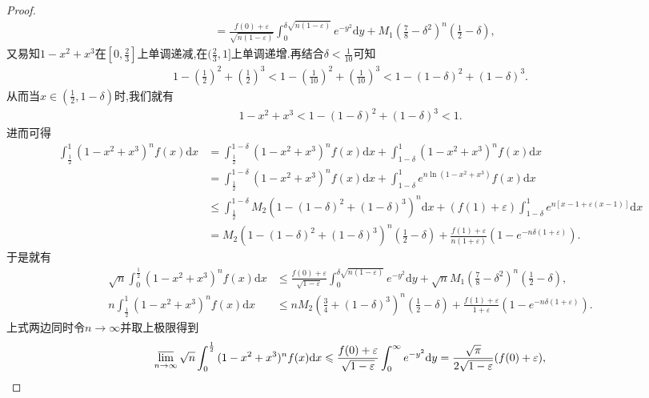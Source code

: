 \documentclass[../../main.tex]{subfiles}%
\begin{document}
\begin{proof}
\begin{align*}
&=\frac{f(0) + \varepsilon}{\sqrt{n(1 - \varepsilon)}}\int_0^{\delta\sqrt{n(1 - \varepsilon)}}{e^{-y^2}\mathrm{d}y}+M_1\left(\frac{7}{8}-\delta^2\right)^n\left(\frac{1}{2}-\delta\right),
\end{align*}
又易知$1-x^2+x^3$在$[0,\frac{2}{3}]$上单调递减,在$(\frac{2}{3},1]$上单调递增.再结合$\delta<\frac{1}{10}$可知
\begin{align*}
1-(\frac{1}{2})^2+(\frac{1}{2})^3<1-(\frac{1}{10})^2+(\frac{1}{10})^3<1-(1-\delta)^2+(1-\delta)^3.
\end{align*}
从而当$x\in (\frac{1}{2},1-\delta)$时,我们就有
\begin{align*}
1-x^2+x^3<1-(1-\delta)^2+(1-\delta)^3<1.
\end{align*}
进而可得
\begin{align*}
\int_{\frac{1}{2}}^1{(1 - x^2 + x^3)^nf(x)\mathrm{d}x}&=\int_{\frac{1}{2}}^{1 - \delta}{(1 - x^2 + x^3)^nf(x)\mathrm{d}x}+\int_{1 - \delta}^1{(1 - x^2 + x^3)^nf(x)\mathrm{d}x}\\
&=\int_{\frac{1}{2}}^{1 - \delta}{(1 - x^2 + x^3)^nf(x)\mathrm{d}x}+\int_{1 - \delta}^1{e^{n\ln(1 - x^2 + x^3)}f(x)\mathrm{d}x}\\
&\leqslant \int_{\frac{1}{2}}^{1 - \delta}{M_2\left(1-(1-\delta)^2+(1 - \delta)^3\right)^n\mathrm{d}x}+(f(1) + \varepsilon)\int_{1 - \delta}^1{e^{n[x - 1 + \varepsilon(x - 1)]}\mathrm{d}x}\\
&=M_2\left(1-(1-\delta)^2+(1 - \delta)^3\right)^n\left(\frac{1}{2}-\delta\right)+\frac{f(1) + \varepsilon}{n(1 + \varepsilon)}\left(1 - e^{-n\delta(1 + \varepsilon)}\right).
\end{align*}
于是就有
\begin{align*}
\sqrt{n}\int_0^{\frac{1}{2}}{(1 - x^2 + x^3)^nf(x)\mathrm{d}x}&\leqslant \frac{f(0) + \varepsilon}{\sqrt{1 - \varepsilon}}\int_0^{\delta\sqrt{n(1 - \varepsilon)}}{e^{-y^2}\mathrm{d}y}+\sqrt{n} M_1\left(\frac{7}{8}-\delta^2\right)^n\left(\frac{1}{2}-\delta\right),\\
n\int_{\frac{1}{2}}^1{(1 - x^2 + x^3)^nf(x)\mathrm{d}x}&\leqslant n M_2\left(\frac{3}{4}+(1 - \delta)^3\right)^n\left(\frac{1}{2}-\delta\right)+\frac{f(1) + \varepsilon}{1 + \varepsilon}\left(1 - e^{-n\delta(1 + \varepsilon)}\right).
\end{align*}
上式两边同时令\(n\rightarrow\infty\)并取上极限得到
\begin{gather*}
\varlimsup_{n\rightarrow\infty}\sqrt{n}\int_0^{\frac{1}{2}}{(1 - x^2 + x^3)^nf(x)\mathrm{d}x}\leqslant \frac{f(0) + \varepsilon}{\sqrt{1 - \varepsilon}}\int_0^{\infty}{e^{-y^2}\mathrm{d}y}=\frac{\sqrt{\pi}}{2\sqrt{1 - \varepsilon}}(f(0) + \varepsilon),\\

\end{gather*}
\end{proof}
\end{document}
